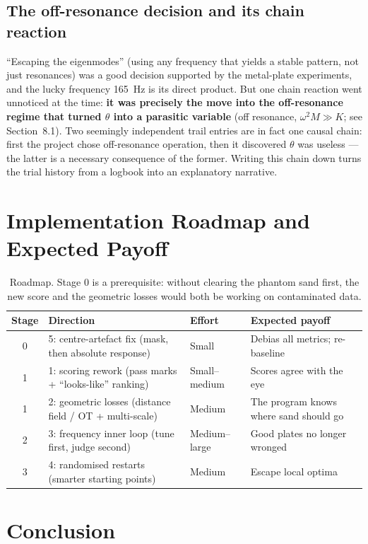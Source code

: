 \documentclass[11pt,a4paper]{article}
\begin{document}
\subsection{The off-resonance decision and its chain reaction}

``Escaping the eigenmodes'' (using any frequency that yields a stable pattern, not just resonances) was a good decision supported by the metal-plate experiments, and the lucky frequency 165~Hz is its direct product. But one chain reaction went unnoticed at the time: \textbf{it was precisely the move into the off-resonance regime that turned $\theta$ into a parasitic variable} (off resonance, $\omega^2 M \gg K$; see Section~8.1). Two seemingly independent trail entries are in fact one causal chain: first the project chose off-resonance operation, then it discovered $\theta$ was useless --- the latter is a necessary consequence of the former. Writing this chain down turns the trial history from a logbook into an explanatory narrative.

\section{Implementation Roadmap and Expected Payoff}

\begin{table}[h]
\centering
\begin{tabular}{@{}clll@{}}
\toprule
Stage & Direction & Effort & Expected payoff \\
\midrule
0 & 5: centre-artefact fix (mask, then absolute response) & Small & Debias all metrics; re-baseline \\
1 & 1: scoring rework (pass marks + ``looks-like'' ranking) & Small--medium & Scores agree with the eye \\
1 & 2: geometric losses (distance field / OT + multi-scale) & Medium & The program knows where sand should go \\
2 & 3: frequency inner loop (tune first, judge second) & Medium--large & Good plates no longer wronged \\
3 & 4: randomised restarts (smarter starting points) & Medium & Escape local optima \\
\bottomrule
\end{tabular}
\caption{Roadmap. Stage 0 is a prerequisite: without clearing the phantom sand first, the new score and the geometric losses would both be working on contaminated data.}
\end{table}

\section{Conclusion}
\end{document}
